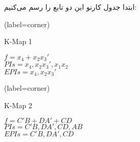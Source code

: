 ابتدا جدول کارنو این دو تابع را رسم می‌کنیم:


\begin{latin}
	\begin{minipage}{0.48\textwidth}
		\centering
		\begin{karnaugh-map}[4][4][1][$x_2$][$x_1$][$x_4$][$x_3$](label=corner)
		\end{karnaugh-map}
		\caption{K-Map 1}
		$f=x_4+x_2x_3'$\\
		$PIs=x_4, x_2x_3',x_1x_2$\\
		$EPIs=x_4, x_2x_3'$\\
	\end{minipage}
	\hfill
	\begin{minipage}{0.48\textwidth}
		\centering
		\begin{karnaugh-map}[4][4][1][$B$][$A$][$D$][$C$](label=corner)
		\end{karnaugh-map}
		\caption{K-Map 2}
		$f=C'B+DA'+CD$\\
		$PIs=C'B,DA',CD, AB$\\
		$EPIs=C'B,DA',CD$\\
	\end{minipage}	
\end{latin}

